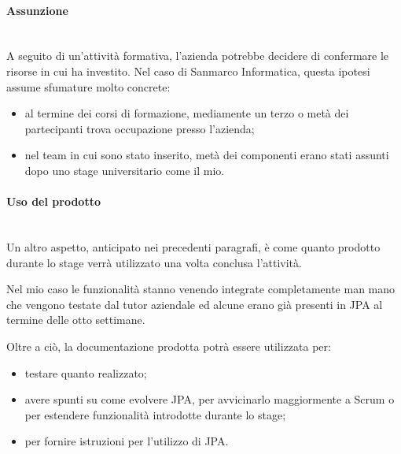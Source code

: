 \paragraph{Assunzione} \mbox{} \\

A seguito di un'attività formativa, l'azienda potrebbe decidere di confermare
le risorse in cui ha investito. Nel caso di Sanmarco Informatica, questa
ipotesi assume sfumature molto concrete:

\begin{itemize}
\item al termine dei corsi di formazione, mediamente un terzo o metà dei
  partecipanti trova occupazione presso l'azienda;
\item nel team in cui sono stato inserito, metà dei componenti erano stati
assunti dopo uno stage universitario come il mio.
\end{itemize}

\paragraph{Uso del prodotto} \mbox{} \\

Un altro aspetto, anticipato nei precedenti paragrafi, è come quanto prodotto
durante lo stage verrà utilizzato una volta conclusa l'attività.

Nel mio caso le funzionalità stanno venendo integrate completamente man mano
che vengono testate dal tutor aziendale ed alcune erano già presenti in JPA al
termine delle otto settimane.

Oltre a ciò, la documentazione prodotta potrà essere utilizzata per:

\begin{itemize}
\item testare quanto realizzato;
\item avere spunti su come evolvere JPA, per avvicinarlo maggiormente a Scrum
  o per estendere funzionalità introdotte durante lo stage;
\item per fornire istruzioni per l'utilizzo di JPA.
\end{itemize}
